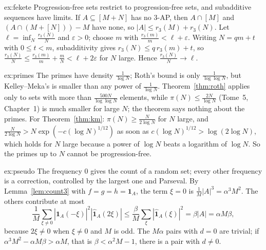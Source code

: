 \begin{solution}{ex:fekete}
\idea Progression-free sets restrict to progression-free sets, and subadditive sequences have limits.
\writeup If $A\subseteq[M+N]$ has no $3$-AP, then $A\cap[M]$ and $(A\cap(M+[N]))-M$ have none, so $|A|\le r_3(M)+r_3(N)$. Let $\ell=\inf_N\frac{r_3(N)}N$ and $\varepsilon>0$; choose $m$ with $\frac{r_3(m)}m<\ell+\varepsilon$. Writing $N=qm+t$ with $0\le t<m$, subadditivity gives $r_3(N)\le q\,r_3(m)+t$, so $\frac{r_3(N)}N\le\frac{r_3(m)}m+\frac mN<\ell+2\varepsilon$ for $N$ large. Hence $\frac{r_3(N)}N\to\ell$.
\end{solution}

\begin{solution}{ex:primes}
\idea The primes have density $\frac1{\log N}$; Roth's bound is only $\frac1{\log\log N}$, but Kelley--Meka's is smaller than any power of $\frac1{\log N}$.
\writeup Theorem~\ref{thm:roth} applies only to sets with more than $\frac{500N}{\log\log N}$ elements, while $\pi(N)\le\frac{2N}{\log N}$ (Tome~5, Chapter~1) is much smaller for large $N$; the theorem says nothing about the primes. For Theorem~\ref{thm:km}: $\pi(N)\ge\frac N{2\log N}$ for $N$ large, and $\frac N{2\log N}>N\exp(-c(\log N)^{1/12})$ as soon as $c(\log N)^{1/12}>\log(2\log N)$, which holds for $N$ large because a power of $\log N$ beats a logarithm of $\log N$. So the primes up to $N$ cannot be progression-free.
\end{solution}

\begin{solution}{ex:pseudo}
\idea The frequency $0$ gives the count of a random set; every other frequency is a correction, controlled by the largest one and Parseval.
\writeup By Lemma~\ref{lem:count3} with $f=g=h=\mathbf1_A$, the term $\xi=0$ is $\frac1M|A|^3=\alpha^3M^2$. The others contribute at most
\[
\frac1M\sum_{\xi\ne0}|\hat{\mathbf1}_A(-\xi)|^2|\hat{\mathbf1}_A(2\xi)|\le\frac\beta M\sum_\xi|\hat{\mathbf1}_A(\xi)|^2=\beta|A|=\alpha M\beta,
\]
because $2\xi\neq0$ when $\xi\ne0$ and $M$ is odd. The $M\alpha$ pairs with $d=0$ are trivial; if $\alpha^3M^2-\alpha M\beta>\alpha M$, that is $\beta<\alpha^2M-1$, there is a pair with $d\neq0$.
\end{solution}

